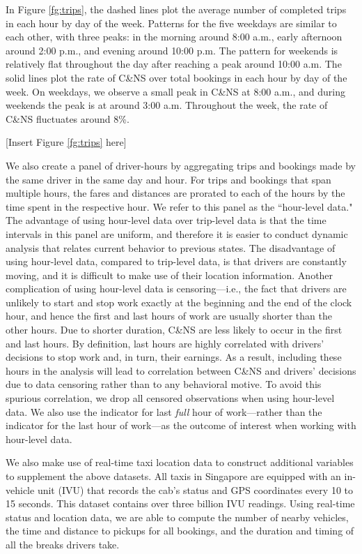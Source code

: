 \documentclass[reviewmode,AEJ]{AEA}
\begin{document}
In Figure \ref{fg:trips}, the dashed lines plot the average number of completed trips in each hour by day
of the week. Patterns for the five weekdays are similar to each other, with three peaks: in the morning 
around 8:00 a.m., early afternoon around 2:00 p.m., and evening around 10:00 p.m. The pattern for weekends 
is relatively flat throughout the day after reaching a peak around 10:00 a.m. The solid lines plot the rate 
of C\&NS over total bookings in each hour by day of the week. On weekdays, we observe a small peak in C\&NS 
at 8:00 a.m., and during weekends the peak is at around 3:00 a.m. Throughout the week, the rate of C\&NS 
fluctuates around 8\%.


\begin{center}
	[Insert Figure \ref{fg:trips} here]
\end{center}


We also create a panel of driver-hours by aggregating trips and bookings made by the same driver in the same 
day and hour. For trips and bookings that span multiple hours, the fares and distances are prorated to each
of the hours by the time spent in the respective hour. We refer to this panel as the ``hour-level data."
The advantage of using hour-level data over trip-level data is that the time intervals in this panel are uniform, 
and therefore it is easier to conduct dynamic analysis that relates current behavior to previous states. 
The disadvantage of using hour-level data, compared to trip-level data, is that drivers are constantly moving,
and it is difficult to make use of their location information. Another complication of using hour-level data
is censoring---i.e., the fact that drivers are unlikely to start and stop work exactly at the beginning and
the end of the clock hour, and hence the first and last hours of work are usually shorter than the other hours.
Due to shorter duration, C\&NS are less likely to occur in the first and last hours. By definition, last hours
are highly correlated with drivers' decisions to stop work and, in turn, their earnings. As a result, 
including these hours in the analysis will lead to correlation between C\&NS and drivers' decisions due to
data censoring rather than to any behavioral motive. To avoid this spurious correlation, we drop all censored
observations when using hour-level data. We also use the indicator for last \emph{full} hour of work---rather 
than the indicator for the last hour of work---as the outcome of interest when working with hour-level data.

We also make use of real-time taxi location data to construct additional variables to supplement the above datasets.
All taxis in Singapore are equipped with an in-vehicle unit (IVU) that records the cab's status and GPS 
coordinates every 10 to 15 seconds. This dataset contains over three billion IVU readings. Using real-time
status and location data, we are able to compute the number of nearby vehicles, the time and distance 
to pickups for all bookings, and the duration and timing of all the breaks drivers take.
\end{document}
